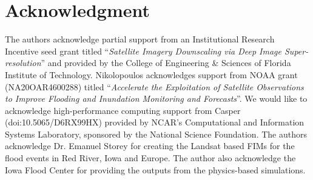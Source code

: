 \section*{Acknowledgment}

The authors acknowledge partial support from an Institutional Research Incentive seed grant titled ``\textit{Satellite Imagery Downscaling via Deep Image Super-resolution}'' and provided by the College of Engineering \& Sciences of Florida Institute of Technology. Nikolopoulos acknowledges support from NOAA grant (NA20OAR4600288) titled ``\textit{Accelerate the Exploitation of Satellite Observations to Improve Flooding and Inundation Monitoring and Forecasts}''. We would like to acknowledge high-performance computing support from Casper (doi:10.5065/D6RX99HX) provided by NCAR’s Computational and Information Systems Laboratory, sponsored by the National Science Foundation. The authors acknowledge Dr. Emanuel Storey for creating the Landsat based \acp{FIM} for the flood events in Red River, Iowa and Europe. The author also acknowledge the Iowa Flood Center for providing the outputs from the physics-based simulations. 